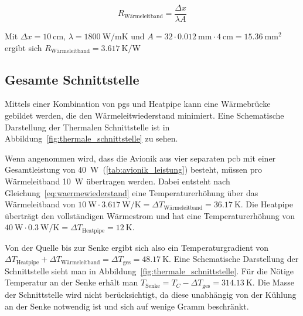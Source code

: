 \begin{equation*}
  R_\mathrm{Wärmeleitband} = \frac{\Delta x}{\lambda A}
\end{equation*}

Mit $\Delta x = \SI{10}{\centi\meter}$, $\lambda = \SI{1800}{\watt\per\meter\kelvin}$ und $A = 32 \cdot \SI{0,012}{\milli\meter} \cdot \SI{4}{\centi\meter} = \SI{15,36}{\milli\meter\squared}$
ergibt sich $R_\mathrm{Wärmeleitband} = \SI{3,617}{\kelvin\per\watt}$

\subsection{Gesamte Schnittstelle}\label{sec:gesamte_schnittstelle}

Mittels einer Kombination von \ac{pgs} und Heatpipe kann eine Wärmebrücke gebildet werden, die den Wärmeleitwiederstand
minimiert. Eine Schematische Darstellung der Thermalen Schnittstelle ist in Abbildung~\ref{fig:thermale_schnittstelle} zu sehen.

Wenn angenommen wird, dass die Avionik aus vier separaten \ac{pcb} mit einer Gesamtleistung von \SI{40}{\watt}~(\ref{tab:avionik_leistung}) besteht, müssen pro Wärmeleitband \SI{10}{\watt} übertragen werden.
Dabei entsteht nach Gleichung~\ref{eq:waermewiederstand} eine Temperaturerhöhung über das Wärmeleitband von $\SI{10}{\watt} \cdot \SI{3,617}{\watt\per\kelvin} = \Delta T_\mathrm{Wärmeleitband} = \SI{36,17}{\kelvin}$.
Die Heatpipe überträgt den vollständigen Wärmestrom und hat eine Temperaturerhöhung von $\SI{40}{\watt} \cdot \SI{0,3}{\watt\per\kelvin} = \Delta T_\mathrm{Heatpipe} = \SI{12}{\kelvin}$.

Von der Quelle bis zur Senke ergibt sich also ein Temperaturgradient von $\Delta T_\mathrm{Heatpipe} + \Delta T_\mathrm{Wärmeleitband} = \Delta T_\mathrm{ges} = \SI{48,17}{\kelvin}$.
Eine Schematische Darstellung der Schnittstelle sieht man in Abbildung~\ref{fig:thermale_schnittstelle}. Für die Nötige Temperatur an der Senke
erhält man $T_\mathrm{Senke} = T_C - \Delta T_\mathrm{ges} = \SI{314,13}{\kelvin}$. Die Masse der Schnittstelle wird nicht berücksichtigt, da diese
unabhängig von der Kühlung an der Senke notwendig ist und sich auf wenige Gramm beschränkt.

